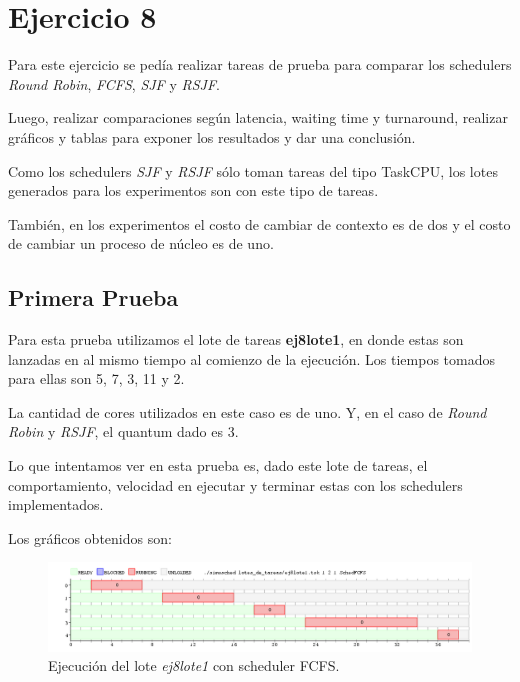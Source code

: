 \section{Ejercicio 8}

Para este ejercicio se pedía realizar tareas de prueba para comparar los schedulers \emph{Round Robin}, \emph{FCFS}, \emph{SJF} y \emph{RSJF}.

Luego, realizar comparaciones según latencia, waiting time y turnaround, realizar gráficos y tablas para exponer los resultados y dar una conclusión.

Como los schedulers \emph{SJF} y \emph{RSJF} sólo toman tareas del tipo TaskCPU, los lotes generados para los experimentos son con este tipo de tareas.

También, en los experimentos el costo de cambiar de contexto es de dos y el costo de cambiar un proceso de núcleo es de uno.

\subsection{Primera Prueba}

Para esta prueba utilizamos el lote de tareas \textbf{ej8lote1}, en donde estas son lanzadas en al mismo tiempo al comienzo de la ejecución. Los tiempos tomados para ellas son 5, 7, 3, 11 y 2.

La cantidad de cores utilizados en este caso es de uno. Y, en el caso de \emph{Round Robin} y \emph{RSJF}, el quantum dado es 3.

Lo que intentamos ver en esta prueba es, dado este lote de tareas, el comportamiento, velocidad en ejecutar y terminar estas con los schedulers implementados.

Los gráficos obtenidos son:

\begin{figure}[!h]
	\begin{center}
		\includegraphics[width=500px]{imagenes/ej8_prueba1_fcfs.png}
		\caption{Ejecución del lote \emph{ej8lote1} con scheduler FCFS.}
		\label{fig:grafico_ej8_prueba1_fcfs}
	\end{center}
\end{figure}

